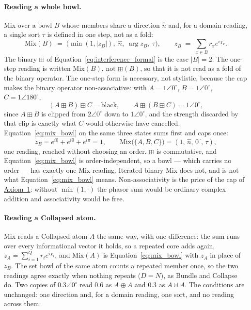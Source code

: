 \documentclass[12pt, a4paper]{article}
\begin{document}
\paragraph{Reading a whole bowl.}
Mix over a bowl $B$ whose members share a direction $\hat n$ and, for
a domain reading, a single sort $\tau$ is
defined in one step, not as a fold:
\begin{equation}
    \mathrm{Mix}(B) \;=\; \bigl(\min(1,|z_B|),\;\hat n,\;\arg z_B,\;\tau\bigr),
    \qquad
    z_B \;=\; \sum_{x\in B} r_x e^{i\chi_x}.
    \label{eq:mix_bowl}
\end{equation}
The binary $\boxplus$ of Equation~\eqref{eq:interference_formal} is the case $|B|=2$. The one-step reading is written $\mathrm{Mix}(B)$, not $\boxplus(B)$, so that it is not read as a fold of the binary operator. The one-step form is necessary, not stylistic,
because the cap makes the binary operator non-associative: with
$A=1\angle 0^\circ$, $B=1\angle 0^\circ$, $C=1\angle 180^\circ$,
\[
(A\boxplus B)\boxplus C=\text{black},
\qquad
A\boxplus(B\boxplus C)=1\angle 0^\circ ,
\]
since $A\boxplus B$ is clipped from $2\angle 0^\circ$ down to
$1\angle 0^\circ$, and the strength discarded by that clip is exactly
what $C$ would otherwise have cancelled.
Equation~\eqref{eq:mix_bowl} on the same three states sums first and
caps once:
\[
z_B = e^{i0}+e^{i0}+e^{i\pi} = 1,
\qquad
\mathrm{Mix}\bigl(\{A,B,C\}\bigr) = (1,\,\hat n,\,0^\circ,\,\tau),
\]
one reading, reached without choosing an order. $\boxplus$ is
commutative,
and Equation~\eqref{eq:mix_bowl} is order-independent, so a bowl ---
which carries no order --- has exactly one Mix reading. Iterated
binary Mix does not, and is not what
Equation~\eqref{eq:mix_bowl} means. Non-associativity is the price of
the cap of \hyperref[subsec:axiom1]{Axiom~1}: without $\min(1,\cdot)$ the
phasor sum would be ordinary complex addition and associativity would
be free.

\paragraph{Reading a Collapsed atom.}
Mix reads a Collapsed atom $A$ the same way, with one difference: the sum
runs over every informational vector it holds, so a repeated core adds
again, $z_A=\sum_{i=1}^{Q} r_i e^{i\chi_i}$, and $\mathrm{Mix}(A)$ is
Equation~\eqref{eq:mix_bowl} with $z_A$ in place of $z_B$. The set bowl of
the same atom counts a repeated member once, so the two readings agree
exactly when nothing repeats ($D=N$), as Bundle and Collapse do. Two
copies of $0.3\angle 0^\circ$ read $0.6$ as $A\oplus A$ and $0.3$ as
$A\uplus A$. The conditions are unchanged: one direction and, for a domain
reading, one sort, and no reading across them.
\end{document}
